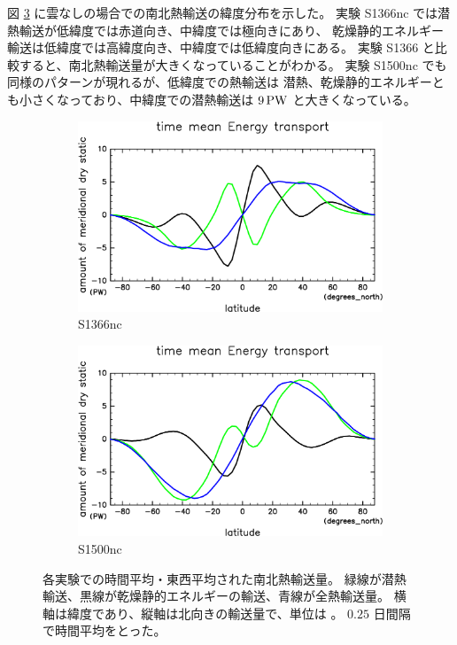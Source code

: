 \documentclass[body]{subfiles}
\begin{document}
\afterpage{\clearpage}

図 \ref{EnFlxnc} に雲なしの場合での南北熱輸送の緯度分布を示した。
実験 S1366nc では潜熱輸送が低緯度では赤道向き、中緯度では極向きにあり、
乾燥静的エネルギー輸送は低緯度では高緯度向き、中緯度では低緯度向きにある。
実験 S1366 と比較すると、南北熱輸送量が大きくなっていることがわかる。
実験 S1500nc でも同様のパターンが現れるが、低緯度での熱輸送は
潜熱、乾燥静的エネルギーとも小さくなっており、中緯度での潜熱輸送は
\(9\hmu{PW}\) と大きくなっている。

\begin{figure}[t]
	\centering
	\begin{subfigure}{.4\textwidth}
		\centering
		\includegraphics[width=\columnwidth]{S1366-nc/EngyFlx,time=3650:4015-crop-rotate.pdf}
		\caption{S1366nc}\label{EnFlxS1366nc}
	\end{subfigure}
	\begin{subfigure}{.4\textwidth}
		\centering
		\includegraphics[width=\columnwidth]{S1500-nc/EngyFlx,time=3650:4015-crop-rotate.pdf}
		\caption{S1500nc}\label{EnFlxS1500nc}
	\end{subfigure}
	\caption[各実験での南北熱輸送量]{
		各実験での時間平均・東西平均された南北熱輸送量。
		緑線が潜熱輸送、黒線が乾燥静的エネルギーの輸送、青線が全熱輸送量。
		横軸は緯度であり、縦軸は北向きの輸送量で、単位は 。
		\(0.25\) 日間隔で時間平均をとった。
	}\label{EnFlxnc}
\end{figure}
\end{document}
